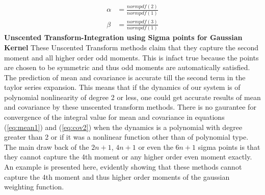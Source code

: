 \documentclass{article}
\begin{document}
	 \begin{align}
	 \alpha&=\frac{normpdf(2)}{normpdf(1)}\\
	 \beta&=\frac{normpdf(3)}{normpdf(1)}
	 \end{align}   
	  \newline\newline\newline\newline
 {\bf Unscented Transform-Integration using Sigma points for Gaussian Kernel}\newline\newline
	 These Unscented Transform methods claim that they capture the second moment and all higher order odd moments. This is infact true because the points are chosen to be symmetric and thus odd moments are automatically satisfied. The prediction of mean and covariance is accurate till the second term in the taylor series expansion. This means that if the dynamics of our system is of polynomial nonlinearity of degree 2 or less, one could get accurate results of mean and covariance by these unscented transform methods. There is no gaurantee for convergence of the integral value for mean and covariance in equations (\ref{eq:mean1}) and (\ref{eq:cov2}) when the dynamics is a polynomial with degree greater than 2 or if it was a nonlinear function other than of polynomial type. The main draw back of the $2n+1$, $4n+1$ or even the $6n+1$ sigma points is that they cannot capture the 4th moment or any higher order even moment exactly. An example is presented here, evidently showing that these methods cannot capture the 4th moment and thus higher order moments of the gaussian weighting function.\newline\newline
	 
\end{document}
